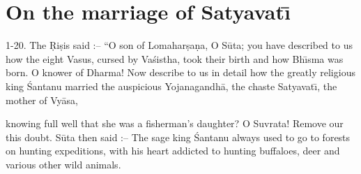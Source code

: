 \chapter{On the marriage of Satyavat\={\i}}

1-20. The \d{R}i\d{s}is said :-- ``O son of Lomahar\d{s}a\d{n}a, O S\=uta; you have described to us how the eight Vasus, cursed by Va\'sistha, took their birth and how Bh\={\i}sma was born. O knower of Dharma! Now describe to us in detail how the greatly religious king \'Santanu married the auspicious Yojanagandh\=a, the chaste Satyavat\={\i}, the mother of Vy\=asa,

knowing full well that she was a fisherman's daughter? O Suvrata! Remove our this doubt. S\=uta then said :-- The sage king \'Santanu always used to go to forests on hunting expeditions, with his heart addicted to hunting buffaloes, deer and various other wild animals.

